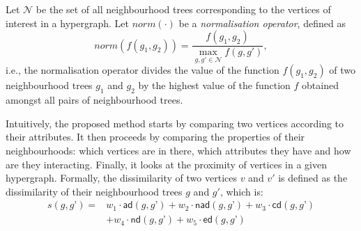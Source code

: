 Let $\mathcal{N}$ be the set of all neighbourhood trees corresponding to the vertices of interest in a hypergraph.
Let $norm(\cdot)$ be a \textit{normalisation operator}, defined as $$norm(f(g_1,g_2)) = \frac{f(g_1,g_2)}{\underset{g,g' \in \mathcal{N}}{\max} f(g,g')},$$ i.e., the normalisation operator divides the value of the function $f(g_1,g_2)$ of two neighbourhood trees $g_1$ and $g_2$ by the highest value of the function $f$ obtained amongst all pairs of neighbourhood trees.



Intuitively, the proposed method starts by comparing two vertices according to their attributes.
It then proceeds by comparing the properties of their neighbourhoods: which vertices are in there, which attributes they have and how are they interacting. 
Finally, it looks at the proximity of vertices in a given hypergraph.
Formally, the dissimilarity of two vertices $v$ and $v'$ is defined as the dissimilarity of their neighbourhood trees $g$ and $g'$, which is:
\begin{equation}
\label{eq:Sim}
\begin{split}
s(g,g’) = & w_1 \cdot \mathsf{ad}(g,g’) + w_2 \cdot \mathsf{nad}(g,g’) + w_3 \cdot \mathsf{cd}(g,g’) \\
     & + w_4 \cdot \mathsf{nd}(g,g’) + w_5 \cdot \mathsf{ed}(g,g’) 
 \end{split}
\end{equation}

